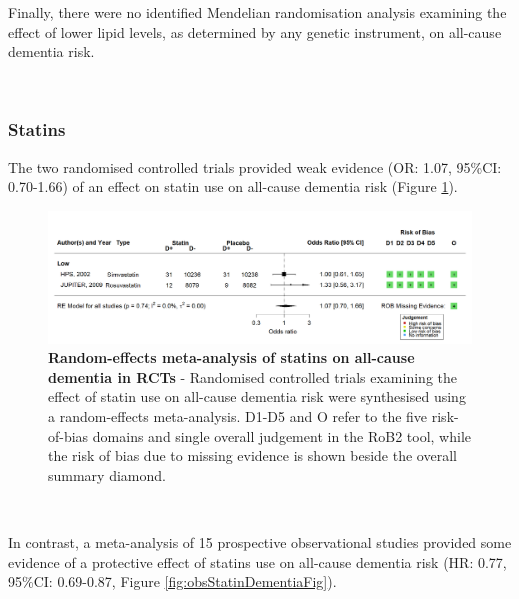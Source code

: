 \documentclass[a4paper, twoside]{templates/ociamthesis}
\begin{document}
\newpage

Finally, there were no identified Mendelian randomisation analysis examining the effect of lower lipid levels, as determined by any genetic instrument, on all-cause dementia risk.

~

\hypertarget{statins}{%
\subsubsection{Statins}\label{statins}}

The two randomised controlled trials provided weak evidence (OR: 1.07, 95\%CI: 0.70-1.66) of an effect on statin use on all-cause dementia risk (Figure \ref{fig:rctStatinDementiaFig}).






\begin{figure}[H]
\includegraphics[width=1\linewidth]{figures/sys-rev/fp_rct_statins_Dementia} \caption[Random-effects meta-analysis of statins on all-cause dementia in RCTs]{\textbf{Random-effects meta-analysis of statins on all-cause dementia in RCTs} -
Randomised controlled trials examining the effect of statin use on all-cause dementia risk were synthesised using a random-effects meta-analysis. D1-D5 and O refer to the five risk-of-bias domains and single overall judgement in the RoB2 tool, while the risk of bias due to missing evidence is shown beside the overall summary diamond.}\label{fig:rctStatinDementiaFig}
\end{figure}

~

In contrast, a meta-analysis of 15 prospective observational studies provided some evidence of a protective effect of statins use on all-cause dementia risk (HR: 0.77, 95\%CI: 0.69-0.87, Figure \ref{fig:obsStatinDementiaFig}).
\end{document}
